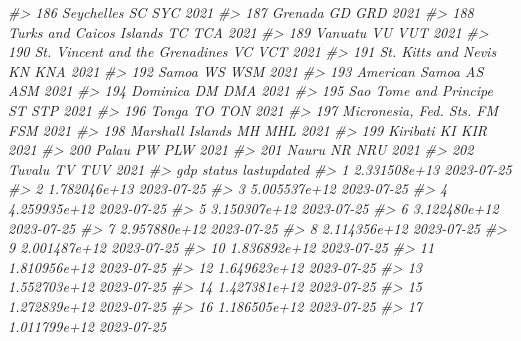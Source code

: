 \documentclass[
  xelatex, ja=standard]{bxjsbook}
\newenvironment{Shaded}{\begin{snugshade}}{\end{snugshade}}
\newcommand{\CommentTok}[1]{\textcolor[rgb]{0.56,0.35,0.01}{\textit{#1}}}
\theoremstyle{definition}
\theoremstyle{definition}
\theoremstyle{definition}
\theoremstyle{definition}
\theoremstyle{remark}
\begin{document}
\begin{Shaded}
\begin{Highlighting}[]
\CommentTok{\#\textgreater{} 186                     Seychelles    SC   SYC 2021}
\CommentTok{\#\textgreater{} 187                        Grenada    GD   GRD 2021}
\CommentTok{\#\textgreater{} 188       Turks and Caicos Islands    TC   TCA 2021}
\CommentTok{\#\textgreater{} 189                        Vanuatu    VU   VUT 2021}
\CommentTok{\#\textgreater{} 190 St. Vincent and the Grenadines    VC   VCT 2021}
\CommentTok{\#\textgreater{} 191            St. Kitts and Nevis    KN   KNA 2021}
\CommentTok{\#\textgreater{} 192                          Samoa    WS   WSM 2021}
\CommentTok{\#\textgreater{} 193                 American Samoa    AS   ASM 2021}
\CommentTok{\#\textgreater{} 194                       Dominica    DM   DMA 2021}
\CommentTok{\#\textgreater{} 195          Sao Tome and Principe    ST   STP 2021}
\CommentTok{\#\textgreater{} 196                          Tonga    TO   TON 2021}
\CommentTok{\#\textgreater{} 197          Micronesia, Fed. Sts.    FM   FSM 2021}
\CommentTok{\#\textgreater{} 198               Marshall Islands    MH   MHL 2021}
\CommentTok{\#\textgreater{} 199                       Kiribati    KI   KIR 2021}
\CommentTok{\#\textgreater{} 200                          Palau    PW   PLW 2021}
\CommentTok{\#\textgreater{} 201                          Nauru    NR   NRU 2021}
\CommentTok{\#\textgreater{} 202                         Tuvalu    TV   TUV 2021}
\CommentTok{\#\textgreater{}              gdp status lastupdated}
\CommentTok{\#\textgreater{} 1   2.331508e+13         2023{-}07{-}25}
\CommentTok{\#\textgreater{} 2   1.782046e+13         2023{-}07{-}25}
\CommentTok{\#\textgreater{} 3   5.005537e+12         2023{-}07{-}25}
\CommentTok{\#\textgreater{} 4   4.259935e+12         2023{-}07{-}25}
\CommentTok{\#\textgreater{} 5   3.150307e+12         2023{-}07{-}25}
\CommentTok{\#\textgreater{} 6   3.122480e+12         2023{-}07{-}25}
\CommentTok{\#\textgreater{} 7   2.957880e+12         2023{-}07{-}25}
\CommentTok{\#\textgreater{} 8   2.114356e+12         2023{-}07{-}25}
\CommentTok{\#\textgreater{} 9   2.001487e+12         2023{-}07{-}25}
\CommentTok{\#\textgreater{} 10  1.836892e+12         2023{-}07{-}25}
\CommentTok{\#\textgreater{} 11  1.810956e+12         2023{-}07{-}25}
\CommentTok{\#\textgreater{} 12  1.649623e+12         2023{-}07{-}25}
\CommentTok{\#\textgreater{} 13  1.552703e+12         2023{-}07{-}25}
\CommentTok{\#\textgreater{} 14  1.427381e+12         2023{-}07{-}25}
\CommentTok{\#\textgreater{} 15  1.272839e+12         2023{-}07{-}25}
\CommentTok{\#\textgreater{} 16  1.186505e+12         2023{-}07{-}25}
\CommentTok{\#\textgreater{} 17  1.011799e+12         2023{-}07{-}25}

\end{Highlighting}
\end{Shaded}
\end{document}

